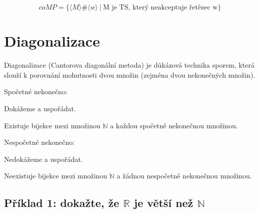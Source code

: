 $$ coMP = \{ \langle M \rangle \# \langle w \rangle ~|~ \text{M je TS, který neakceptuje řetězec w} \} $$


\section{Diagonalizace}

\begin{compactitem}
    \item Diagonalizace (Cantorova diagonální metoda) je důkázová technika sporem, která slouží k porovnání mohutnosti dvou množin (zejména dvou nekonečných množin).

    \item Spočetné nekonečno: \begin{compactitem}
        \item Dokážeme  a uspořádat.
        \item Existuje bijekce mezi množinou $\mathbb{N}$ a každou spočetně nekonečnou množinou.
    \end{compactitem}

    \item Nespočetné nekonečno: \begin{compactitem}
        \item Nedokážeme  a uspořádat.
        \item Neexistuje bijekce mezi množinou $\mathbb{N}$ a žádnou nespočetně nekonečnou množinou.
    \end{compactitem}
\end{compactitem}

\subsection*{Příklad 1: dokažte, že $\mathbb{R}$ je větší než $\mathbb{N}$}

